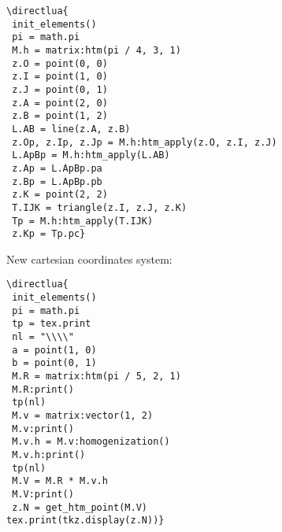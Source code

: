 \begin{minipage}{.6\textwidth}
\begin{verbatim}
\directlua{
 init_elements()
 pi = math.pi
 M.h = matrix:htm(pi / 4, 3, 1)
 z.O = point(0, 0)
 z.I = point(1, 0)
 z.J = point(0, 1)
 z.A = point(2, 0)
 z.B = point(1, 2)
 L.AB = line(z.A, z.B)
 z.Op, z.Ip, z.Jp = M.h:htm_apply(z.O, z.I, z.J)
 L.ApBp = M.h:htm_apply(L.AB)
 z.Ap = L.ApBp.pa
 z.Bp = L.ApBp.pb
 z.K = point(2, 2)
 T.IJK = triangle(z.I, z.J, z.K)
 Tp = M.h:htm_apply(T.IJK)
 z.Kp = Tp.pc}
\end{verbatim}
\end{minipage}
\begin{minipage}{.4\textwidth}
\end{minipage}

\vspace{.5 em}

New  cartesian coordinates system:

\vspace{.5 em}
\begin{minipage}{.5\textwidth}
\begin{verbatim}
\directlua{
 init_elements()
 pi = math.pi
 tp = tex.print
 nl = "\\\\"
 a = point(1, 0)
 b = point(0, 1)
 M.R = matrix:htm(pi / 5, 2, 1)
 M.R:print()
 tp(nl)
 M.v = matrix:vector(1, 2)
 M.v:print()
 M.v.h = M.v:homogenization()
 M.v.h:print()
 tp(nl)
 M.V = M.R * M.v.h
 M.V:print()
 z.N = get_htm_point(M.V)
tex.print(tkz.display(z.N))}
\end{verbatim}
\end{minipage}
\begin{minipage}{.5\textwidth}
\end{minipage}




